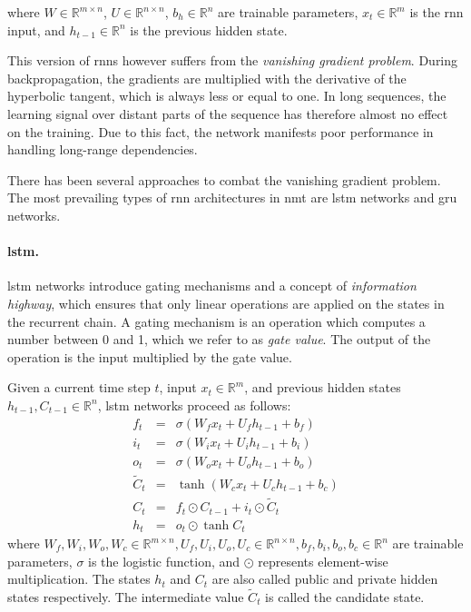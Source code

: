 \noindent where $W \in \mathbb{R}^{m \times n}$, $U \in \mathbb{R}^{n \times
n}$, $b_h \in \mathbb{R}^{n}$ are trainable parameters, $x_t \in \mathbb{R}^{m}$
is the \gls{rnn} input, and $h_{t-1} \in \mathbb{R}^{n}$ is the previous hidden
state.

This version of \glspl{rnn} however suffers from the \emph{vanishing gradient
problem}. During backpropagation, the gradients are multiplied with the
derivative of the hyperbolic tangent, which is always less or equal to one. In
long sequences, the learning signal over distant parts of the sequence has
therefore almost no effect on the training. Due to this fact, the network
manifests poor performance in handling long-range dependencies.

There has been several approaches to combat the vanishing gradient problem.  The
most prevailing types of \gls{rnn} architectures in \gls{nmt} are \gls{lstm}
networks and \gls{gru} networks.

\paragraph{\acrshort{lstm}.} \acrlong{lstm} networks \citep{hochreiter1997long}
introduce gating mechanisms and a concept of \emph{information highway}, which
ensures that only linear operations are applied on the states in the recurrent
chain. A gating mechanism is an operation which computes a number between 0 and
1, which we refer to as \emph{gate value}.  The output of the operation is the
input multiplied by the gate value.

Given a current time step $t$, input $x_t \in \mathbb{R}^m$, and previous hidden
states $h_{t-1}, C_{t-1} \in \mathbb{R}^n$, \gls{lstm} networks proceed as
follows:
%
\begin{eqnarray} f_t & = & \sigma\left(W_f x_t + U_f h_{t-1} + b_f\right)
\label{eq:lstm-forget-gate}\\ i_t & = & \sigma\left(W_i x_t + U_i h_{t-1} +
b_i\right)
\label{eq:lstm-input-gate}\\ o_t & = & \sigma\left(W_o x_t + U_o h_{t-1} +
b_o\right)
\label{eq:lstm-output-gate}\\ \tilde{C}_t & = & \tanh \left( W_c x_t + U_c
h_{t-1} + b_c \right)\label{eq:lstm-candidate} \\ C_t & = & f_t \odot C_{t-1} +
i_t \odot \tilde{C}_t
\label{eq:lstm-information-highway}\\ h_t & = & o_t \odot \tanh
C_t \label{eq:lstm-hidden-state}
\end{eqnarray}
%
where $W_f, W_i, W_o, W_c \in \mathbb{R}^{m \times n}, U_f, U_i, U_o, U_c \in
\mathbb{R}^{n \times n}, b_f, b_i, b_o, b_c \in \mathbb{R}^n$ are trainable
parameters, $\sigma$ is the logistic function, and $\odot$ represents
element-wise multiplication. The states $h_t$ and $C_t$ are also called public
and private hidden states respectively. The intermediate value $\tilde{C}_t$ is
called the candidate state.

